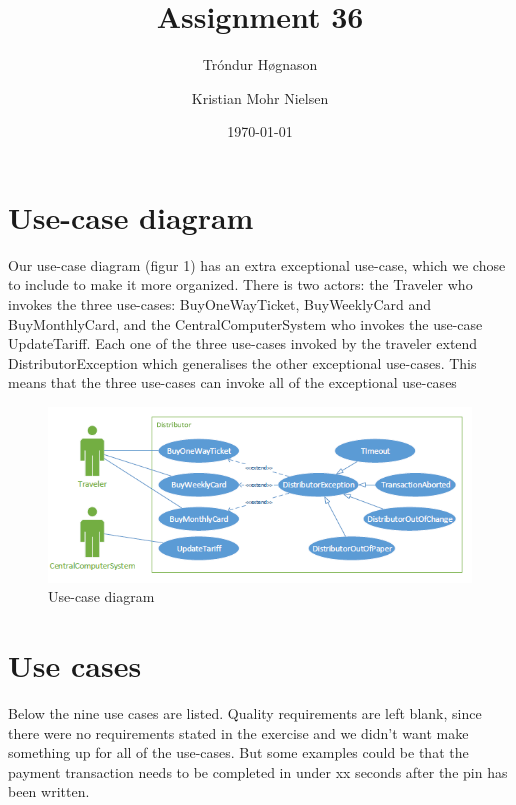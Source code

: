 \documentclass[pdftex,12pt,a4paper]{article}
\begin{document}
\title{Assignment 36}
\author{Tróndur Høgnason \and  Kristian Mohr Nielsen}
\date{\today}
\maketitle
\pagebreak

\section{Use-case diagram}
Our use-case diagram (figur 1) has an extra exceptional use-case, which we chose to include to make it more organized. There is two actors: the Traveler who invokes the three use-cases: BuyOneWayTicket, BuyWeeklyCard and BuyMonthlyCard, and the CentralComputerSystem who invokes the use-case UpdateTariff. Each one of the three use-cases invoked by the traveler extend DistributorException which generalises the other exceptional use-cases. This means that the three use-cases can invoke all of the exceptional use-cases
\begin{figure}[h]
\centering
\includegraphics[scale = 0.9]{usecase.png}
\caption{Use-case diagram}
\end{figure}
\pagebreak

\section{Use cases}
Below the nine use cases are listed. Quality requirements are left blank, since there were no requirements stated in the exercise and we didn't want make something up for all of the use-cases. But some examples could be that the payment transaction needs to be completed in under xx seconds after the pin has been written. 


\pagebreak

\pagebreak

\pagebreak

\pagebreak

\pagebreak

\pagebreak

\pagebreak

\pagebreak

\pagebreak
\end{document}
